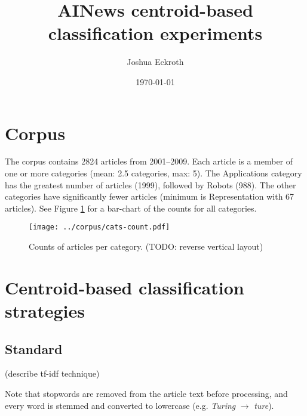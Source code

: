 \documentclass{article}
\title{AINews centroid-based classification experiments}
\author{Joshua Eckroth}
\date{\today}
\begin{document}
\maketitle


\section{Corpus}

The corpus contains 2824 articles from 2001--2009. Each article is a member of
one or more categories (mean: 2.5 categories, max: 5). The Applications
category has the greatest number of articles (1999), followed by Robots (988).
The other categories have significantly fewer articles (minimum is
Representation with 67 articles). See Figure \ref{fig:cats-counts} for
a bar-chart of the counts for all categories.

\begin{figure}[ht]
\begin{center}
\texttt{[image: ../corpus/cats-count.pdf]}
\caption{Counts of articles per category. (TODO: reverse vertical layout)}
\label{fig:cats-counts}
\end{center}
\end{figure}

\section{Centroid-based classification strategies}

\subsection{Standard}

(describe tf-idf technique)

Note that stopwords are removed from the article text before processing, and
every word is stemmed and converted to lowercase (e.g. \emph{Turing}
$\rightarrow$ \emph{ture}).
\end{document}
